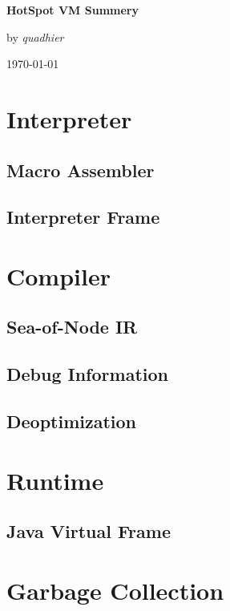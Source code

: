 \documentclass[UTF8, 12pt]{ctexart}
\begin{document}
\begin{titlepage}
	\centering
  \vspace*{\fill}
	{\huge\bfseries HotSpot VM Summery\par}
  \vspace*{5cm}
  \vspace*{\fill}
  {\Large by \it{quadhier}\par}
	{\Large \today}
\end{titlepage}

\tableofcontents
\setcounter{page}{0}
\newpage


\section{Interpreter}
\subsection{Macro Assembler}
\subsection{Interpreter Frame}


\section{Compiler}
\subsection{Sea-of-Node IR}
\subsection{Debug Information}
\subsection{Deoptimization}


\section{Runtime}
\subsection{Java Virtual Frame}


\section{Garbage Collection}
\end{document}
